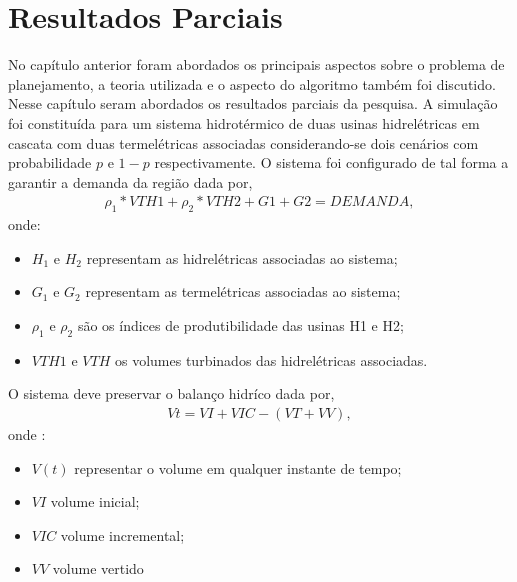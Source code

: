 \graphicspath{ {/home/jefferson/Modelamento/} }
\chapter{Resultados Parciais}
No cap\'itulo anterior foram abordados os principais aspectos sobre o problema de planejamento, a teoria utilizada e o
aspecto do algoritmo tamb\'em foi discutido. Nesse cap\'itulo seram abordados os resultados parciais da pesquisa.
A simula\c c\~ao  foi constitu\'ida para um sistema hidrot\'ermico de duas usinas hidrel\'etricas em cascata
com duas termel\'etricas associadas considerando-se dois cen\'arios com probabilidade $p$ e $1-p$ respectivamente.
O sistema foi configurado de tal forma a garantir a demanda da regi\~ao dada por,
\begin{align*}
  \displaystyle{\rho}_1*VTH1 + {\rho}_2*VTH2 + G1 + G2 = DEMANDA,
\end{align*}
onde:
\begin{itemize}
	\item $H_1$ e $H_2$ representam as hidrel\'etricas associadas ao sistema;
	\item $G_1$ e $G_2$ representam as termel\'etricas associadas ao sistema;
	\item $\rho_1$ e $\rho_2$ s\~ao os \'indices de produtibilidade das usinas H1 e H2;
	\item $VTH1$ e $VTH$  os volumes turbinados das hidrel\'etricas associadas.
\end{itemize}
O sistema deve preservar o balan\c co hidr\'ico dada por,
{\setlength{\belowdisplayskip}{-4pt}
\begin{align*}
  \displaystyle Vt = VI + VIC - \left( VT + VV \right), 
\end{align*}}
onde : 
\begin{itemize}
	\item $V(t)$ representar o volume em qualquer instante de tempo;
	\item $VI$  volume inicial;
	\item $VIC$ volume incremental;
	\item $VV$ volume vertido
\end{itemize}
